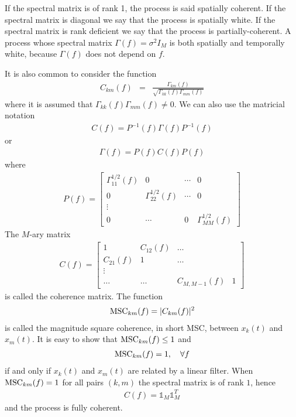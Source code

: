 If the spectral matrix is of rank 1, the process is said spatially coherent. If the spectral matrix is diagonal we say that the process is spatially white. If the spectral matrix is rank deficient we say that the process is partially-coherent. A process whose spectral matrix $\Gamma(f)=\sigma^{2}I_{M}$ is both spatially and temporally  white, because $\Gamma(f)$ does not depend on $f$.

It is also common to consider the function
\begin{eqnarray}
\label{eq:correlationcoherence}
 C_{km}(f)
 &=&\frac{\Gamma_{km}(f)}{\sqrt{\Gamma_{kk}(f)\Gamma_{mm}(f)}}
\end{eqnarray}
where it is assumed that $\Gamma_{kk}(f)\Gamma_{mm}(f)\neq 0$. We can also use the matricial notation
\begin{eqnarray}
 \label{eq:def-generalMSC}
  C(f) = P^{-1}(f)  \Gamma(f) P^{-1}(f)
\end{eqnarray}
or
\begin{eqnarray}
 \label{eq:reverse-def-generalMSC}
  \Gamma(f) = P(f) C(f) P(f)
\end{eqnarray}
where
\begin{eqnarray}
  \label{eq:spectral-content}
 P(f) =   \begin{bmatrix}
  \Gamma_{11}^{1/2}(f)&0&\cdots&0
  \\
  0&\Gamma_{22}^{1/2}(f)&\cdots&0
  \\
  \vdots
  \\
  0&\cdots&0&\Gamma_{MM}^{1/2}(f)
  \end{bmatrix}
\end{eqnarray}
The $M$-ary matrix
\begin{eqnarray}
 \label{eq:coherence-matrix}
 C(f)=\begin{bmatrix}
1&C_{12}(f)&\ldots\\
C_{21}(f)&1& \ldots\\
\vdots\\
\ldots&\ldots&C_{M,M-1}(f)&1
\end{bmatrix}
\end{eqnarray}
is called the coherence matrix. The  function 
\begin{eqnarray}
 \label{eq:def-coherence-function}
 \mathrm{MSC}_{km}(f)=|C_{km}(f)|^{2}
\end{eqnarray}
is called the magnitude square coherence, in short MSC, between $x_{k}(t)$ and $x_{m}(t)$. 
It is easy to show that $\mathrm{MSC}_{km}(f)\leq 1$ and
\begin{eqnarray}
 \label{eq:rhomlfeq1}
 \mathrm{MSC}_{km}(f)=1,\quad \forall f
\end{eqnarray}
if and only if $x_{k}(t)$ and $x_{m}(t)$ are related by a linear filter. When $\mathrm{MSC}_{km}(f)=1$ for all pairs $(k,m)$ the spectral matrix is of rank $1$, hence 
\begin{eqnarray}
C(f)={\mathds 1}_M{\mathds 1}_M^T
\end{eqnarray}
and the process is fully coherent. 
